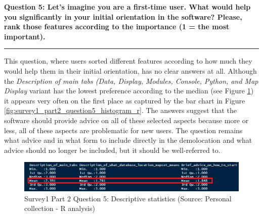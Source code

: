 \documentclass[a4paper,10pt,twoside]{article}
\begin{document}
\newpage
\noindent \textbf{Question 5: Let's imagine you are a first-time user. What would help you significantly in your initial orientation in the software? Please, rank those features according to the importance (1 = the most important).}
\par\noindent\rule{\textwidth}{0.4pt}

\noindent This question, where users sorted different features according to how much they would help them in their initial orientation, has no clear answers at all. Although the \textit{Description of main tabs (Data, Display, Modules, Console, Python, and Map Display} variant has the lowest preference according to the median (see Figure \ref{fig:survey1_part2_question5_stats}) it appears very often on the first place as captured by the bar chart in Figure \ref{fig:survey1_part2_question5_histogram_r}. The answers suggest that the software should provide advice on all of these selected aspects because more or less, all of these aspects are problematic for new users. The question remains what advice and in what form to include directly in the demolocation and what advice should no longer be included, but it should be well-referred to.
    
\vspace{0.3cm}
\begin{figure}[hbt!] 
\begin{center}
\includegraphics[width=16cm]{../surveys/analyzed_data/survey1_part2_question5_stats.png} 
\caption[Survey1 Part 2 Question 5: Descriptive statistics]{Survey1 Part 2 Question 5: Descriptive statistics (Source: Personal collection - R analysis)}
\label{fig:survey1_part2_question5_stats}
\end{center}
\end{figure}
\end{document}
